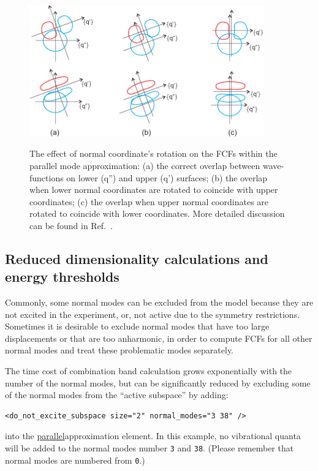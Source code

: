 \documentclass[11pt]{article}
\begin{document}
\begin{figure}[h!]
  \centering
  \caption{The effect of normal coordinate's rotation on the FCFs within the parallel mode
approximation: (a) the correct overlap between wave-functions on lower (q'') and upper (q') surfaces;
(b) the overlap when lower normal coordinates are rotated to coincide with upper coordinates;
(c) the overlap when upper normal coordinates are rotated to coincide with lower coordinates. 
More detailed discussion can be found in Ref.~\cite{Koziol:HCOH:2009}.}
  \includegraphics[width=0.9\textwidth]{nm_rotations.pdf}
  \label{fig:rotations}
\end{figure}


\subsection{Reduced dimensionality calculations and energy thresholds}
\label{sec:para:subspace}

Commonly, some normal modes can be excluded from the model because they are not excited in the experiment,
or, not active due to the symmetry restrictions. Sometimes it is desirable to exclude normal modes that have too large displacements or that are too anharmonic,
in order to compute FCFs for all other normal modes and treat these problematic modes separately.


The time cost of combination band calculation grows exponentially with the number of the normal modes, 
but can be significantly reduced by excluding some of the normal modes from the ``active subspace'' 
by adding:
\begin{lstlisting}[frame=single,framerule=0pt]
   <do_not_excite_subspace size="2" normal_modes="3 38" />
\end{lstlisting}
into the \ul{parallel}{approximation} element. In this example, no vibrational quanta will be added to 
the normal modes number {\tt 3} and {\tt 38}. (Please remember that normal modes are numbered from {\tt 0}.)
\end{document}
